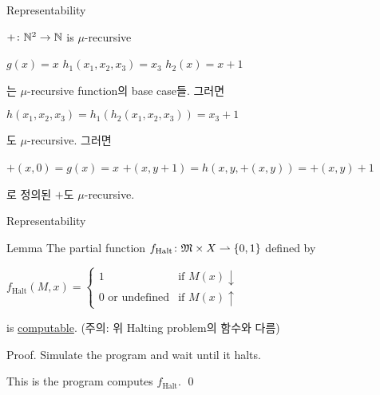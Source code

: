 \documentclass[../231120_msquare_computational-logic.tex]{subfiles}
\begin{document}
\begin{frame}{Representability}
    \begin{exampleblock}{\(+ \colon \mathbb{N}^2 \to \mathbb{N}\) is \(\mu\)-recursive}
        \begin{itemize}
            \ii \(g(x) = x\)
            \ii \(h_1(x_1, x_2, x_3) = x_3\)
            \ii \(h_2(x) = x + 1\)
        \end{itemize}
        는 \(\mu\)-recursive function의 base case들.
        그러면
        \begin{itemize}
            \ii \(h(x_1, x_2, x_3) = h_1(h_2(x_1, x_2, x_3)) = x_3 + 1\)
        \end{itemize}
        도 \(\mu\)-recursive. 그러면
        \begin{itemize}
            \ii \(+(x, 0) = g(x) = x\)
            \ii \(+(x, y + 1) = h(x, y, +(x, y)) = +(x, y) + 1\)
        \end{itemize}
        로 정의된 \(+\)도 \(\mu\)-recursive.
    \end{exampleblock}
\end{frame}

\begin{frame}{Representability}
    \begin{block}{Lemma}
        The partial function \(f_\text{Halt} \colon \mathfrak{M} \times X \rightharpoonup \{0, 1\}\) defined by
        \centerline{\(f_\text{Halt}(M, x) = \begin{cases}
            1 & \text{if } M(x) \downarrow \\
            0 \text{ or undefined} & \text{if } M(x) \uparrow
        \end{cases}\)}
        is \ul{computable}. (주의: 위 Halting problem의 함수와 다름)
    \end{block}
    \pause
    \begin{block}{Proof.}
        Simulate the  program and wait until it halts.
        \begin{center}
        \end{center}
        This is the  program computes \(f_\text{Halt}\).
        \qed
    \end{block}
\end{frame}
\end{document}
